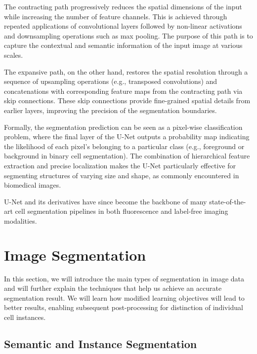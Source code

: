 The contracting path progressively reduces the spatial dimensions of the input while increasing the number of feature channels. This is achieved through repeated applications of convolutional layers followed by non-linear activations and downsampling operations such as max pooling. The purpose of this path is to capture the contextual and semantic information of the input image at various scales.

The expansive path, on the other hand, restores the spatial resolution through a sequence of upsampling operations (e.g., transposed convolutions) and concatenations with corresponding feature maps from the contracting path via skip connections. These skip connections provide fine-grained spatial details from earlier layers, improving the precision of the segmentation boundaries.

Formally, the segmentation prediction can be seen as a pixel-wise classification problem, where the final layer of the U-Net outputs a probability map indicating the likelihood of each pixel's belonging to a particular class (e.g., foreground or background in binary cell segmentation). The combination of hierarchical feature extraction and precise localization makes the U-Net particularly effective for segmenting structures of varying size and shape, as commonly encountered in biomedical images.

U-Net and its derivatives have since become the backbone of many state-of-the-art cell segmentation pipelines in both fluorescence and label-free imaging modalities.

\section{Image Segmentation}

In this section, we will introduce the main types of segmentation in image data and will further explain the techniques that help us achieve an accurate segmentation result. We will learn how modified learning objectives will lead to better results, enabling subsequent post-processing for distinction of individual cell instances. 


\subsection{Semantic and Instance Segmentation}


